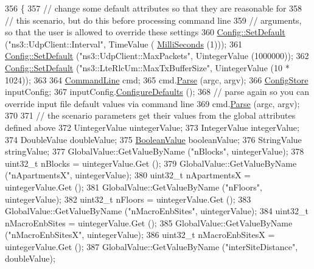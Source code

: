 \begin{DoxyCode}
356 \{
357   \textcolor{comment}{// change some default attributes so that they are reasonable for}
358   \textcolor{comment}{// this scenario, but do this before processing command line}
359   \textcolor{comment}{// arguments, so that the user is allowed to override these settings }
360   \hyperlink{group__config_ga2e7882df849d8ba4aaad31c934c40c06}{Config::SetDefault} (\textcolor{stringliteral}{"ns3::UdpClient::Interval"}, TimeValue (
      \hyperlink{group__timecivil_gaf26127cf4571146b83a92ee18679c7a9}{MilliSeconds} (1)));
361   \hyperlink{group__config_ga2e7882df849d8ba4aaad31c934c40c06}{Config::SetDefault} (\textcolor{stringliteral}{"ns3::UdpClient::MaxPackets"}, UintegerValue (1000000));
362   \hyperlink{group__config_ga2e7882df849d8ba4aaad31c934c40c06}{Config::SetDefault} (\textcolor{stringliteral}{"ns3::LteRlcUm::MaxTxBufferSize"}, UintegerValue (10 * 1024));
363 
364   \hyperlink{classns3_1_1CommandLine}{CommandLine} cmd;
365   cmd.\hyperlink{classns3_1_1CommandLine_a5c10b85b3207e5ecb48d907966923156}{Parse} (argc, argv);
366   \hyperlink{classns3_1_1ConfigStore}{ConfigStore} inputConfig;
367   inputConfig.\hyperlink{classns3_1_1ConfigStore_a0a6137574d7c847c3823af8b9d1bb886}{ConfigureDefaults} ();
368   \textcolor{comment}{// parse again so you can override input file default values via command line}
369   cmd.\hyperlink{classns3_1_1CommandLine_a5c10b85b3207e5ecb48d907966923156}{Parse} (argc, argv); 
370 
371   \textcolor{comment}{// the scenario parameters get their values from the global attributes defined above}
372   UintegerValue uintegerValue;
373   IntegerValue integerValue;
374   DoubleValue doubleValue;
375   \hyperlink{classns3_1_1BooleanValue}{BooleanValue} booleanValue;
376   StringValue stringValue;
377   GlobalValue::GetValueByName (\textcolor{stringliteral}{"nBlocks"}, uintegerValue);
378   uint32\_t nBlocks = uintegerValue.Get ();
379   GlobalValue::GetValueByName (\textcolor{stringliteral}{"nApartmentsX"}, uintegerValue);
380   uint32\_t nApartmentsX = uintegerValue.Get ();
381   GlobalValue::GetValueByName (\textcolor{stringliteral}{"nFloors"}, uintegerValue);
382   uint32\_t nFloors = uintegerValue.Get ();
383   GlobalValue::GetValueByName (\textcolor{stringliteral}{"nMacroEnbSites"}, uintegerValue);
384   uint32\_t nMacroEnbSites = uintegerValue.Get ();
385   GlobalValue::GetValueByName (\textcolor{stringliteral}{"nMacroEnbSitesX"}, uintegerValue);
386   uint32\_t nMacroEnbSitesX = uintegerValue.Get ();
387   GlobalValue::GetValueByName (\textcolor{stringliteral}{"interSiteDistance"}, doubleValue);

\end{DoxyCode}

